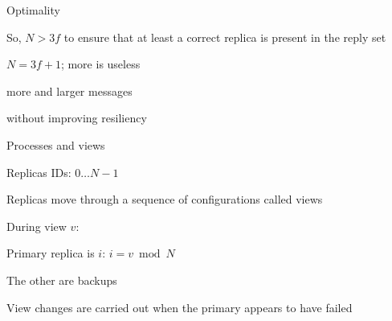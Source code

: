 \begin{frame}{Optimality}
\BIL
\item So, $N>3f$ to ensure that at least a correct replica is present in the reply set
\item $N=3f+1$; more is useless
\BI
\item more and larger messages
\item without improving resiliency
\EI
\EIL
	
\end{frame}


\begin{frame}{Processes and views}

\BIL
\item Replicas IDs: $0 \ldots N-1$
\item Replicas move through a sequence of configurations called \alert{views}
\item During view $v$:
\BI
\item \alert{Primary} replica is $i$: $i = v \bmod N$
\item The other are \alert{backups}
\EI
\item \alert{View changes} are carried out when the primary appears to have failed
\EIL	
	
\end{frame}

